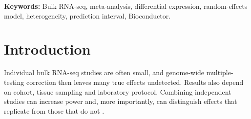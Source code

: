 \documentclass[11pt,a4paper]{article}
\begin{document}
\begin{abstract}
\begin{itemize}[noitemsep,topsep=1pt]
    \item \emph{Pancreatic ductal adenocarcinoma (PDAC).} Three cohorts implicate NF-$\kappa$B/AP-1 activity, myeloid and fibroblast enrichment, and an MST1R-centred epithelial module. Among 5,425 compounds, TGF-$\beta$ receptor inhibitors and erlotinib are top reversers of the tumour signature.
\end{itemize}
The case studies also show practical limits. With four studies, HKSJ-adjusted tests cannot reach genome-wide significance, and a single large cohort dominates many findings.\\
\textbf{Availability:} MIT-licensed at \url{https://github.com/hossainlab/metaXpress}, with executable vignettes on the data analysed here.
\end{abstract}

\vspace{0.2cm}
\noindent\textbf{Keywords:} Bulk RNA-seq, meta-analysis, differential expression, random-effects model, heterogeneity, prediction interval, Bioconductor.

\vspace{0.4cm}

\section{Introduction}
Individual bulk RNA-seq studies are often small, and genome-wide multiple-testing correction then leaves many true effects undetected. Results also depend on cohort, tissue sampling and laboratory protocol. Combining independent studies can increase power and, more importantly, can distinguish effects that replicate from those that do not \cite{rau2014metarnaseq}.
\end{document}
